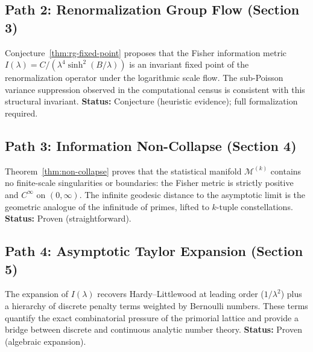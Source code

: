\documentclass[11pt]{article}
\theoremstyle{remark}
\begin{document}
\subsection*{Path 2: Renormalization Group Flow (Section 3)}
Conjecture~\ref{thm:rg-fixed-point} proposes that the Fisher information
metric $I(\lambda) = C/(\lambda^4 \sinh^2(B/\lambda))$ is an invariant
fixed point of the renormalization operator under the logarithmic scale
flow. The sub-Poisson variance suppression observed in the computational
census is consistent with this structural invariant.
\textbf{Status:} Conjecture (heuristic evidence); full formalization required.

\subsection*{Path 3: Information Non-Collapse (Section 4)}
Theorem~\ref{thm:non-collapse} proves that the statistical manifold
$\mathcal{M}^{(k)}$ contains no finite-scale singularities or boundaries:
the Fisher metric is strictly positive and $C^\infty$ on $(0, \infty)$.
The infinite geodesic distance to the asymptotic limit is the geometric
analogue of the infinitude of primes, lifted to $k$-tuple constellations.
\textbf{Status:} Proven (straightforward).

\subsection*{Path 4: Asymptotic Taylor Expansion (Section 5)}
The expansion of $I(\lambda)$ recovers Hardy--Littlewood at leading
order ($1/\lambda^2$) plus a hierarchy of discrete penalty terms weighted
by Bernoulli numbers. These terms quantify the exact combinatorial
pressure of the primorial lattice and provide a bridge between discrete
and continuous analytic number theory.
\textbf{Status:} Proven (algebraic expansion).
\end{document}

